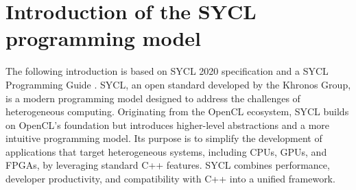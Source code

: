 
\section{Introduction of the SYCL programming model}

% 
% 
% 
% 
% 
% 

The following introduction is based on SYCL 2020 specification \cite{SYCL2020} and a SYCL Programming Guide \cite{reinders2020data}.
SYCL, an open standard developed by the Khronos Group, is a modern programming model designed to address the challenges of
heterogeneous computing. Originating from the OpenCL ecosystem, SYCL builds on OpenCL's foundation but introduces higher-level
abstractions and a more intuitive programming model. Its purpose is to simplify the development of applications that target
heterogeneous systems, including CPUs, GPUs, and FPGAs, by leveraging standard C++ features. SYCL combines performance,
developer productivity, and compatibility with C++ into a unified framework. 


